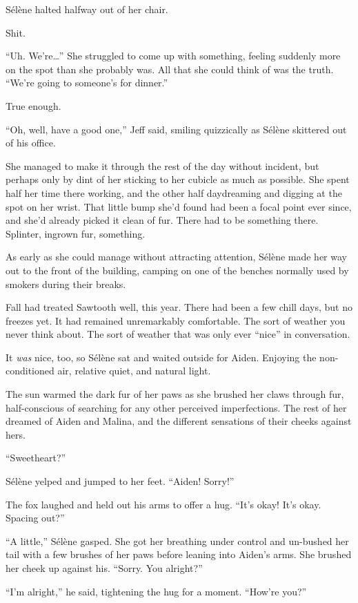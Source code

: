 Sélène halted halfway out of her chair.

Shit.

``Uh. We're\ldots{}'' She struggled to come up with something, feeling suddenly more on the spot than she probably was. All that she could think of was the truth. ``We're going to someone's for dinner.''

True enough.

``Oh, well, have a good one,'' Jeff said, smiling quizzically as Sélène skittered out of his office.

She managed to make it through the rest of the day without incident, but perhaps only by dint of her sticking to her cubicle as much as possible. She spent half her time there working, and the other half daydreaming and digging at the spot on her wrist. That little bump she'd found had been a focal point ever since, and she'd already picked it clean of fur. There had to be something there. Splinter, ingrown fur, something.

As early as she could manage without attracting attention, Sélène made her way out to the front of the building, camping on one of the benches normally used by smokers during their breaks.

Fall had treated Sawtooth well, this year. There had been a few chill days, but no freezes yet. It had remained unremarkably comfortable. The sort of weather you never think about. The sort of weather that was only ever ``nice'' in conversation.

It \emph{was} nice, too, so Sélène sat and waited outside for Aiden. Enjoying the non-conditioned air, relative quiet, and natural light.

The sun warmed the dark fur of her paws as she brushed her claws through fur, half-conscious of searching for any other perceived imperfections. The rest of her dreamed of Aiden and Malina, and the different sensations of their cheeks against hers.

``Sweetheart?''

Sélène yelped and jumped to her feet. ``Aiden! Sorry!''

The fox laughed and held out his arms to offer a hug. ``It's okay! It's okay. Spacing out?''

``A little,'' Sélène gasped. She got her breathing under control and un-bushed her tail with a few brushes of her paws before leaning into Aiden's arms. She brushed her cheek up against his. ``Sorry. You alright?''

``I'm alright,'' he said, tightening the hug for a moment. ``How're you?''

